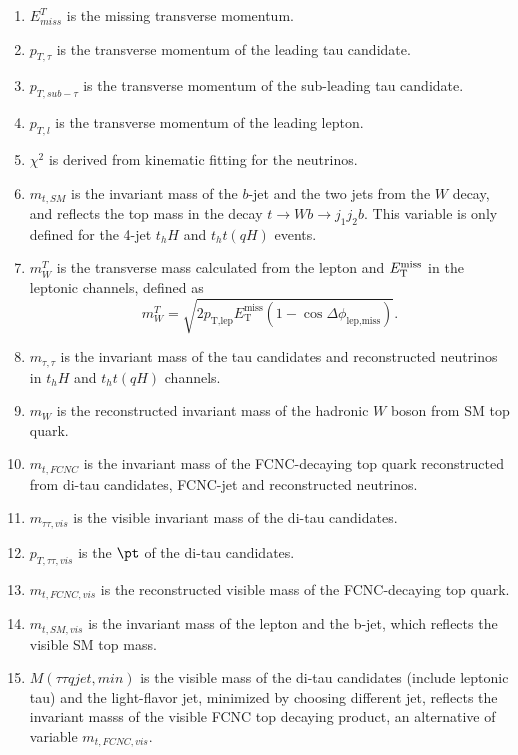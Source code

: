 \begin{enumerate}

\item $E^{T}_{miss}$ is the missing transverse momentum.
\item $p_{T,\tau}$ is the transverse momentum of the leading tau candidate.
\item $p_{T,sub-\tau}$ is the transverse momentum of the sub-leading tau candidate.
\item $p_{T,l}$ is the transverse momentum of the leading lepton.
\item $\chi^2$ is derived from kinematic fitting for the neutrinos.
\item $m_{t,SM}$ is the invariant mass of the $b$-jet and the two jets from the $W$ decay, and reflects the top mass in the decay $t\to Wb \to j_1j_2b$. This variable is only defined for the 4-jet $t_hH$ and $t_ht(qH)$ events.
\item $m^{T}_{W}$ is the transverse mass calculated from the lepton and $E_{\text{T}}^{\text{miss}}$ in the leptonic channels, defined as
\begin{equation}
m^{T}_{W} = \sqrt{2 p_{\text{T,lep}} E_{\text{T}}^{\text{miss}} \left(1-\cos\Delta\phi_{\text{lep,miss}} \right)}.  
\end{equation}
\item $m_{\tau,\tau}$ is the invariant mass of the tau candidates and reconstructed neutrinos in $t_hH$ and $t_ht(qH)$ channels. 
\item $m_{W}$ is the reconstructed invariant mass of the hadronic $W$ boson from SM top quark.
\item $m_{t,FCNC}$ is the invariant mass of the FCNC-decaying top quark reconstructed from di-tau candidates, FCNC-jet and reconstructed neutrinos.
\item $m_{\tau\tau,vis}$ is the visible invariant mass of the di-tau candidates.
\item $p_{T,\tau\tau,vis}$ is the $\pt$ of the di-tau candidates.
\item $m_{t,FCNC,vis}$ is the reconstructed visible mass of the FCNC-decaying top quark.
\item $m_{t,SM,vis}$ is the invariant mass of the lepton and the b-jet, which reflects the visible SM top mass.
\item $M(\tau\tau qjet,min)$ is the visible mass of the di-tau candidates (include leptonic tau) and the light-flavor jet, minimized by choosing different jet, reflects the invariant masss of the visible FCNC top decaying product, an alternative of variable $m_{t,FCNC,vis}$.

\end{enumerate}
